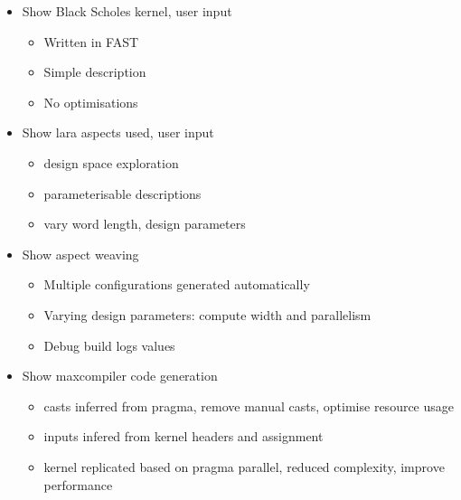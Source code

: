 \begin{frame}
  \begin{itemize}
  \item Show Black Scholes kernel, user input
    \begin{itemize}
    \item Written in FAST
    \item Simple description
    \item No optimisations
    \end{itemize}
  \item Show lara aspects used, user input
    \begin{itemize}
    \item design space exploration
    \item parameterisable descriptions
    \item vary word length, design parameters
    \end{itemize}
  \item Show aspect weaving
    \begin{itemize}
    \item Multiple configurations generated automatically
    \item Varying design parameters: compute width and parallelism
    \item Debug build logs values
    \end{itemize}
  \item Show maxcompiler code generation
    \begin{itemize}
    \item casts inferred from pragma, remove manual casts, optimise resource usage
    \item inputs infered from kernel headers and assignment
    \item kernel replicated based on pragma parallel, reduced
      complexity, improve performance
    \end{itemize}
  \end{itemize}
\end{frame}
